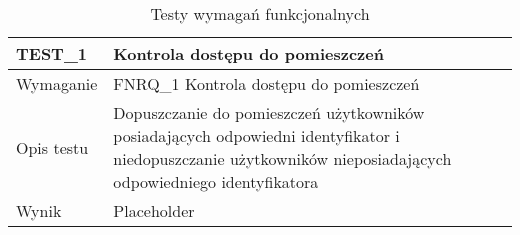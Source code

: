         \begin{table}[h!]
            \caption{Testy wymagań funkcjonalnych}
            \centering
            \begin{subtable}[c]{\textwidth}
                \centering
                \begin{tabular}{|p{2cm}|p{12cm}|}
                    \hline TEST\_1      & \textbf{Kontrola dostępu do pomieszczeń} \\
                    \hline \cellcolor[gray]{0.8} Wymaganie    & FNRQ\_1 Kontrola dostępu do pomieszczeń  \\
                    \hline \cellcolor[gray]{0.8} Opis testu        & Dopuszczanie do pomieszczeń użytkowników posiadających odpowiedni identyfikator i niedopuszczanie użytkowników nieposiadających odpowiedniego identyfikatora  \\
                    \hline \cellcolor[gray]{0.8} Wynik        & Placeholder \\
                    \hline
                \end{tabular}
                \label{tbl:test1}
                \vspace{10mm}           
            \end{subtable}
            \label{tbl:tests}
        \end{table}
    
